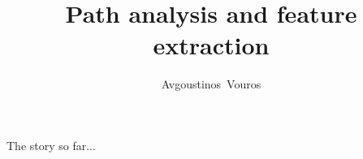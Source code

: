 \documentclass{beamer}
\title{Path analysis and feature extraction}
\author{Avgoustinos~Vouros\inst{1}}
\institute[] %
{
  \inst{1}%
  PhD student, \\Department of Computer Science,\\
  University of Sheffield\\
  \vspace{5mm}
  \noindent Supervised by Prof Eleni Vasilaki
}
\date{} %
\newlength{\tmpShadow}
\newcommand{\MyShadow}[2]{%
	\settowidth{\tmpShadow}{#1}
	\addtolength{\tmpShadow}{.1em}
	\raisebox{-0.25ex}{\textcolor{gray!70}{#1}}%
	\kern-\tmpShadow%
	\textcolor{#2}{#1}%
}
\begin{document}
\begin{frame}
  \titlepage
\end{frame}





\begin{frame}[plain,c]
	\vspace{1mm}
	\begin{center}
		\Huge The story so far...
	\end{center}
\end{frame}
\end{document}
